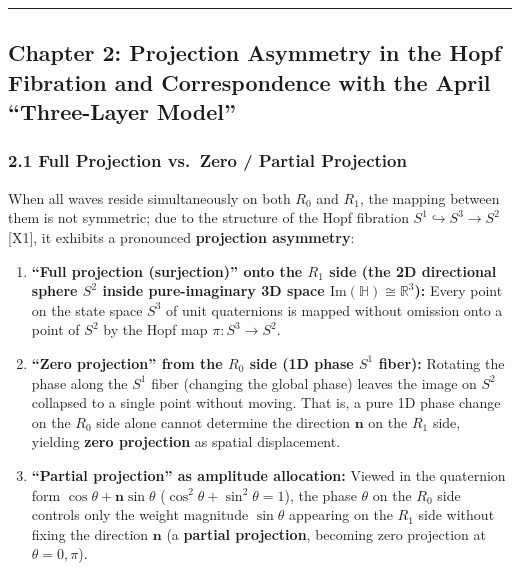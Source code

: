 \documentclass[
  a4paper,
]{article}
\providecommand{\tightlist}{%
  \setlength{\itemsep}{0pt}\setlength{\parskip}{0pt}}
\begin{document}
\begin{center}\rule{0.5\linewidth}{0.5pt}\end{center}

\subsection{Chapter 2: Projection Asymmetry in the Hopf Fibration and
Correspondence with the April ``Three-Layer
Model''}\label{chapter-2-projection-asymmetry-in-the-hopf-fibration-and-correspondence-with-the-april-three-layer-model}

\subsubsection{2.1 Full Projection vs.~Zero / Partial
Projection}\label{full-projection-vs.-zero-partial-projection}

When all waves reside simultaneously on both \(R_0\) and \(R_1\), the
mapping between them is not symmetric; due to the structure of the Hopf
fibration \(S^1 \hookrightarrow S^3 \to S^2\) {[}X1{]}, it exhibits a
pronounced \textbf{projection asymmetry}:

\begin{enumerate}
\def\labelenumi{\arabic{enumi}.}
\tightlist
\item
  \textbf{``Full projection (surjection)'' onto the \(R_1\) side (the 2D
  directional sphere \(S^2\) inside pure-imaginary 3D space
  \(\mathrm{Im}(\mathbb{H}) \cong \mathbb{R}^3\)):} Every point on the
  state space \(S^3\) of unit quaternions is mapped without omission
  onto a point of \(S^2\) by the Hopf map \(\pi : S^3 \to S^2\).
\item
  \textbf{``Zero projection'' from the \(R_0\) side (1D phase \(S^1\)
  fiber):} Rotating the phase along the \(S^1\) fiber (changing the
  global phase) leaves the image on \(S^2\) collapsed to a single point
  without moving. That is, a pure 1D phase change on the \(R_0\) side
  alone cannot determine the direction \(\mathbf{n}\) on the \(R_1\)
  side, yielding \textbf{zero projection} as spatial displacement.
\item
  \textbf{``Partial projection'' as amplitude allocation:} Viewed in the
  quaternion form \(\cos\theta + \mathbf{n}\sin\theta\)
  (\(\cos^2\theta + \sin^2\theta = 1\)), the phase \(\theta\) on the
  \(R_0\) side controls only the weight magnitude \(\sin\theta\)
  appearing on the \(R_1\) side without fixing the direction
  \(\mathbf{n}\) (a \textbf{partial projection}, becoming zero
  projection at \(\theta = 0, \pi\)).
\end{enumerate}
\end{document}
